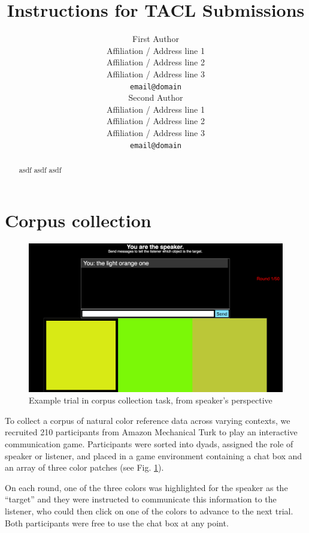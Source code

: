 \documentclass[11pt,letterpaper]{article}
\title{Instructions for TACL Submissions}
\author{First Author \\
  Affiliation / Address line 1 \\
  Affiliation / Address line 2 \\
  Affiliation / Address line 3 \\
  {\tt email@domain} \\\And
  Second Author \\
  Affiliation / Address line 1 \\
  Affiliation / Address line 2 \\
  Affiliation / Address line 3 \\
  {\tt email@domain} \\}
\date{}
\begin{document}
\maketitle
\begin{abstract}

asdf asdf asdf 

\end{abstract}

\section{Corpus collection}

\begin{figure}
\includegraphics[scale = .2]{figures/speakerView.png}
\caption{Example trial in corpus collection task, from speaker's perspective}
\label{taskScreenshot}
\end{figure}

To collect a corpus of natural color reference data across varying contexts, we recruited 210 participants from Amazon Mechanical Turk to play an interactive communication game. Participants were sorted into dyads, assigned the role of speaker or listener, and placed in a game environment containing a chat box and an array of three color patches (see Fig. \ref{taskScreenshot}). 

On each round, one of the three colors was highlighted for the speaker as the ``target'' and they were instructed to communicate this information to the listener, who could then click on one of the colors to advance to the next trial. Both participants were free to use the chat box at any point.
\end{document}
